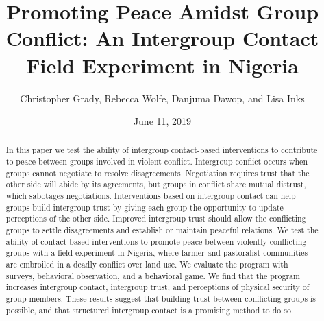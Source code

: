 \documentclass[11pt]{article}
\title{Promoting Peace Amidst Group Conflict: An Intergroup Contact Field
Experiment in Nigeria}
\author{
Christopher Grady, Rebecca Wolfe, Danjuma Dawop, and Lisa Inks
}
\date{June 11, 2019}
\begin{document}
\VerbatimFootnotes

%
%
%
%
%
%
%
%
%
%

\maketitle

\begin{abstract}

In this paper we test the ability of intergroup contact-based interventions to contribute to peace between groups involved in violent conflict.  Intergroup conflict occurs when groups cannot negotiate to resolve disagreements.  Negotiation requires trust that the other side will abide by its agreements, but groups in conflict share mutual distrust, which sabotages negotiations.  Interventions based on intergroup contact can help groups build intergroup trust by giving each group the opportunity to update perceptions of the other side.  Improved intergroup trust should allow the conflicting groups to settle disagreements and establish or maintain peaceful relations.  We test the ability of contact-based interventions to promote peace between violently conflicting groups with a field experiment in Nigeria, where farmer and pastoralist communities are embroiled in a deadly conflict over land use.  We evaluate the program with surveys, behavioral observation, and a behavioral game.  We find that the program increases intergroup contact, intergroup trust, and perceptions of physical security of group members.  These results suggest that building trust between conflicting groups is possible, and that structured intergroup contact is a promising method to do so.

\end{abstract}
\end{document}
